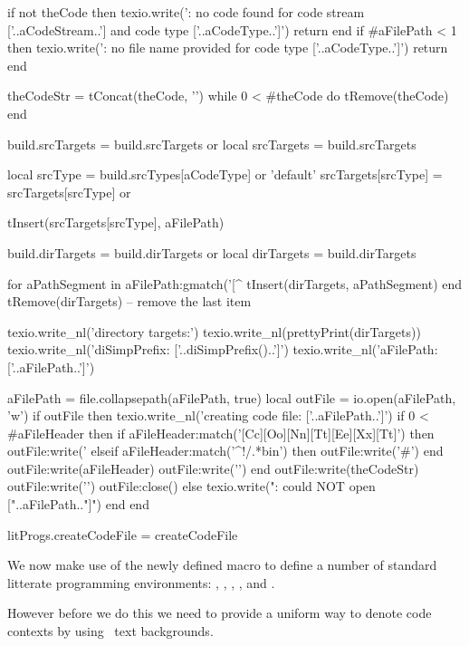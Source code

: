   if not theCode then
    texio.write('\nERROR: no code found for code stream ['..aCodeStream..'] and code type ['..aCodeType..']\n\n')
    return
  end
  if #aFilePath < 1 then
    texio.write('\nERROR: no file name provided for code type ['..aCodeType..']\n\n')
    return
  end

  theCodeStr = tConcat(theCode, '\n\n')
  while 0 < #theCode do tRemove(theCode) end

  build.srcTargets = build.srcTargets or { }
  local srcTargets = build.srcTargets

  local srcType       = build.srcTypes[aCodeType] or 'default'
  srcTargets[srcType] = srcTargets[srcType] or { }

  tInsert(srcTargets[srcType], aFilePath)

  build.dirTargets = build.dirTargets or { }
  local dirTargets = build.dirTargets

  for aPathSegment in aFilePath:gmatch('[^%
    tInsert(dirTargets, aPathSegment)
  end
  tRemove(dirTargets) -- remove the last item

  texio.write_nl('directory targets:')
  texio.write_nl(prettyPrint(dirTargets))
  texio.write_nl('diSimpPrefix: ['..diSimpPrefix()..']')
  texio.write_nl('aFilePath: ['..aFilePath..']')

  aFilePath = file.collapsepath(aFilePath, true)
  local outFile = io.open(aFilePath, 'w')
  if outFile then
    texio.write_nl('creating code file: ['..aFilePath..']')
    if 0 < #aFileHeader then
      if aFileHeader:match('[Cc][Oo][Nn][Tt][Ee][Xx][Tt]') then
        outFile:write('%
      elseif aFileHeader:match('^!/.*bin') then
        outFile:write('#')
      end
      outFile:write(aFileHeader)
      outFile:write('\n\n')
    end
    outFile:write(theCodeStr)
    outFile:write('\n\n')
    outFile:close()
  else
    texio.write("\nERROR: could NOT open ["..aFilePath.."]\n")
  end
end

litProgs.createCodeFile = createCodeFile
\stopLuaCode

\stopTestSuite

We now make use of the newly defined  macro to
define a number of standard litterate programming environments:
, , , ,
 and .

However before we do this we need to provide a uniform way to denote code
contexts by using \ConTeXt\ text backgrounds.

\startMkIVCode
{}
\setuptextbackground%
  [LitProgFrame]%
  [location=paragraph, background=color, backgroundcolor=gray]
\stopMkIVCode

